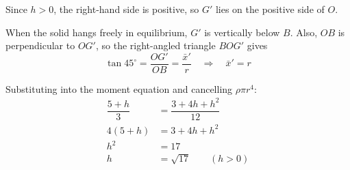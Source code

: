 \documentclass[leqno]{article}
\begin{document}
\begin{enumerate}[
  label=\textbf{\arabic*.},
  leftmargin=*,
  topsep=0pt,
  partopsep=0pt,
  parsep=0pt
]
\begin{djsSolution}
\begin{enumerate}[label=\textbf{(\alph*)}, start=1]
Since \(h>0\), the right-hand side is positive, so \(G'\) lies on the positive side of \(O\).

When the solid hangs freely in equilibrium, \(G'\) is vertically below \(B\). Also, \(OB\) is perpendicular to \(OG'\), so the right-angled triangle \(BOG'\) gives
\[
\tan45^\circ=\dfrac{OG'}{OB}=\dfrac{\bar{x}'}{r}
\quad\Longrightarrow\quad \bar{x}'=r
\]

Substituting into the moment equation and cancelling \(\rho\pi r^4\):
\begin{align*}
\dfrac{5+h}{3}&=\dfrac{3+4h+h^2}{12} \\
4(5+h)&=3+4h+h^2 \\
h^2&=17 \\
h&=\sqrt{17}\qquad(h>0)
\end{align*}

\end{enumerate}
\end{djsSolution}

\newpage

\questionitem


\end{enumerate}
\end{document}
